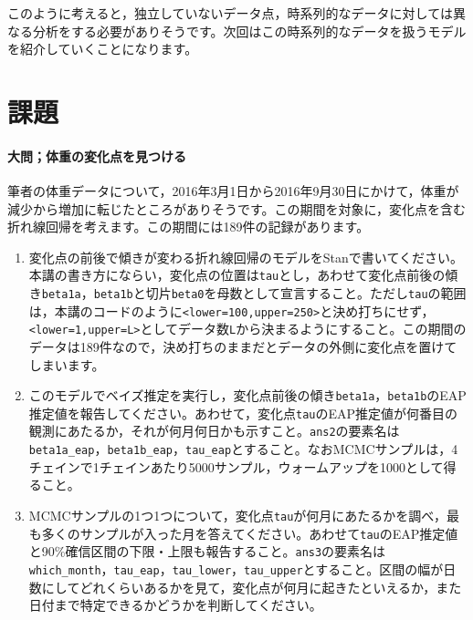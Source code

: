 \documentclass{ltjsbook}
\begin{document}
このように考えると，独立していないデータ点，時系列的なデータに対しては異なる分析をする必要がありそうです。次回はこの時系列的なデータを扱うモデルを紹介していくことになります。

\section{課題}


\paragraph{大問；体重の変化点を見つける}
筆者の体重データについて，2016年3月1日から2016年9月30日にかけて，体重が減少から増加に転じたところがありそうです。この期間を対象に，変化点を含む折れ線回帰を考えます。この期間には189件の記録があります。
\begin{enumerate}
	\item 変化点の前後で傾きが変わる折れ線回帰のモデルをStanで書いてください。本講の書き方にならい，変化点の位置は\verb|tau|とし，あわせて変化点前後の傾き\verb|beta1a|，\verb|beta1b|と切片\verb|beta0|を母数として宣言すること。ただし\verb|tau|の範囲は，本講のコードのように\verb|<lower=100,upper=250>|と決め打ちにせず，\verb|<lower=1,upper=L>|としてデータ数\verb|L|から決まるようにすること。この期間のデータは189件なので，決め打ちのままだとデータの外側に変化点を置けてしまいます。
	\item このモデルでベイズ推定を実行し，変化点前後の傾き\verb|beta1a|，\verb|beta1b|のEAP推定値を報告してください。あわせて，変化点\verb|tau|のEAP推定値が何番目の観測にあたるか，それが何月何日かも示すこと。\verb|ans2|の要素名は\verb|beta1a_eap|，\verb|beta1b_eap|，\verb|tau_eap|とすること。なおMCMCサンプルは，4チェインで1チェインあたり5000サンプル，ウォームアップを1000として得ること。
	\item MCMCサンプルの1つ1つについて，変化点\verb|tau|が何月にあたるかを調べ，最も多くのサンプルが入った月を答えてください。あわせて\verb|tau|のEAP推定値と90\%確信区間の下限・上限も報告すること。\verb|ans3|の要素名は\verb|which_month|，\verb|tau_eap|，\verb|tau_lower|，\verb|tau_upper|とすること。区間の幅が日数にしてどれくらいあるかを見て，変化点が何月に起きたといえるか，また日付まで特定できるかどうかを判断してください。
\end{enumerate}
\end{document}
